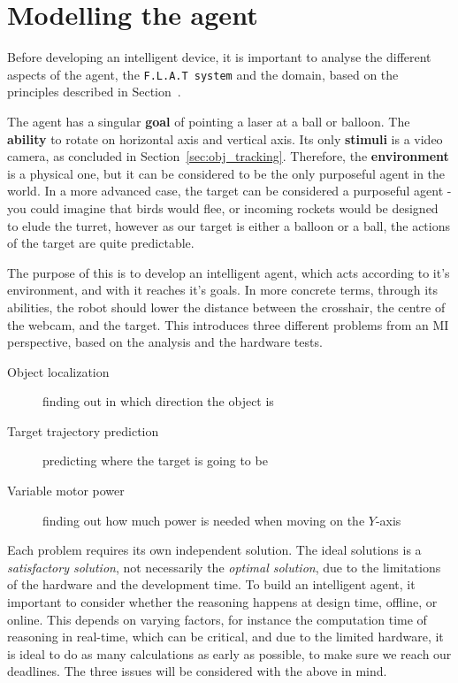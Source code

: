 \section{Modelling the agent}\label{Design:MI}
Before developing an intelligent device, it is important to analyse the different aspects of the agent, the \texttt{F.L.A.T system} and the domain, based on the principles described in Section~.


The agent has a singular \textbf{goal} of pointing a laser at a ball or balloon.
The \textbf{ability} to rotate on horizontal axis and vertical axis.
Its only \textbf{stimuli} is a video camera, as concluded in Section~\ref{sec:obj_tracking}.
Therefore, the \textbf{environment} is a physical one, but it can be considered to be the only purposeful agent in the world.
In a more advanced case, the target can be considered a purposeful agent - you could imagine that birds would flee, or incoming rockets would be designed to elude the turret, however as our target is either a balloon or a ball, the actions of the target are quite predictable.

The purpose of this is to develop an intelligent agent, which acts according to it's environment, and with it reaches it's goals.
In more concrete terms, through its abilities, the robot should lower the distance between the crosshair, the centre of the webcam, and the target.
This introduces three different problems from an MI perspective, based on the analysis and the hardware tests.
\begin{description}
	\item[Object localization] finding out in which direction the object is
	\item[Target trajectory prediction] predicting where the target is going to be
	\item[Variable motor power] finding out how much power is needed when moving on the $Y$-axis
\end{description}


Each problem requires its own independent solution.
The ideal solutions is a \textit{satisfactory solution}, not necessarily the \textit{optimal solution}, due to the limitations of the hardware and the development time.
To build an intelligent agent, it important to consider whether the reasoning happens at design time, offline, or online.
This depends on varying factors, for instance the computation time of reasoning in real-time, which can be critical, and due to the limited hardware, it is ideal to do as many calculations as early as possible, to make sure we reach our deadlines.
The three issues will be considered with the above in mind.

